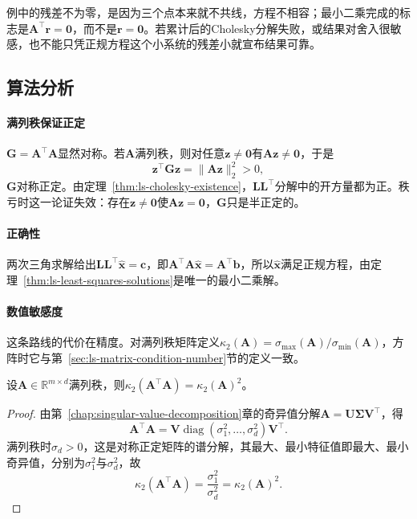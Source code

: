 例中的残差不为零，是因为三个点本来就不共线，方程不相容；最小二乘完成的标志是$\bm A^\top\bm r=\bm0$，而不是$\bm r=\bm0$。若累计后的Cholesky分解失败，或结果对舍入很敏感，也不能只凭正规方程这个小系统的残差小就宣布结果可靠。

\subsection{算法分析}

\paragraph{满列秩保证正定}
$\bm G=\bm A^\top\bm A$显然对称。若$\bm A$满列秩，则对任意$\bm z\neq\bm0$有$\bm A\bm z\neq\bm0$，于是
\[
 \bm z^\top\bm G\bm z=\lVert\bm A\bm z\rVert_2^2>0 ,
\]
$\bm G$对称正定。由定理~\ref{thm:ls-cholesky-existence}，$\bm L\bm L^\top$分解中的开方量都为正。秩亏时这一论证失效：存在$\bm z\neq\bm0$使$\bm A\bm z=\bm0$，$\bm G$只是半正定的。

\paragraph{正确性}
两次三角求解给出$\bm L\bm L^\top\hat{\bm x}=\bm c$，即$\bm A^\top\bm A\hat{\bm x}=\bm A^\top\bm b$，所以$\hat{\bm x}$满足正规方程，由定理~\ref{thm:ls-least-squares-solutions}是唯一的最小二乘解。

\paragraph{数值敏感度}
这条路线的代价在精度。对满列秩矩阵定义$\kappa_2(\bm A)=\sigma_{\max}(\bm A)/\sigma_{\min}(\bm A)$，方阵时它与第~\ref{sec:ls-matrix-condition-number}节的定义一致。

\begin{theorem}[正规方程使条件数平方]
\label{thm:ls-normal-equations-condition-squaring}
设$\bm A\in\mathbb R^{m\times d}$满列秩，则$\kappa_2(\bm A^\top\bm A)=\kappa_2(\bm A)^2$。
\end{theorem}
\begin{proof}
由第~\ref{chap:singular-value-decomposition}章的奇异值分解$\bm A=\bm U\bm\Sigma\bm V^\top$，得
\[
 \bm A^\top\bm A=\bm V\operatorname{diag}(\sigma_1^2,\ldots,\sigma_d^2)\bm V^\top .
\]
满列秩时$\sigma_d>0$，这是对称正定矩阵的谱分解，其最大、最小特征值即最大、最小奇异值，分别为$\sigma_1^2$与$\sigma_d^2$，故
\[
 \kappa_2(\bm A^\top\bm A)=\frac{\sigma_1^2}{\sigma_d^2}=\kappa_2(\bm A)^2 .
\]
\end{proof}

